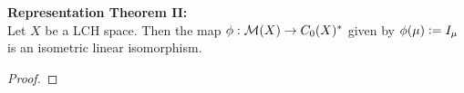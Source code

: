 \documentclass{book}
\begin{document}
	\begin{ex}  \textbf{Representation Theorem II:}\\
		Let $X$ be a LCH space. Then the map $\phi: \mathcal{M}(X) \rightarrow C_0(X)^*$ given by $\phi(\mu) \vcentcolon= I_{\mu}$ is an isometric linear isomorphism. 
	\end{ex}
	
	\begin{proof}
	\end{proof}
	
	
	
	
	
	
	
	
	
	
	
	
	
	
	
	
	
	
	
	
	
	
	
	
	
	
	
	
	
	
	
	
	
	
	
	
	

	









	
	
	
	
	
	
	
	
	
	
	
	
	
	
	
	
	
	
	
	
	
	
	
	
	
	
	
	
	
	
	
	
	
	
	
	
	
	
	
	
	
	
	
	
	
	
\end{document}
